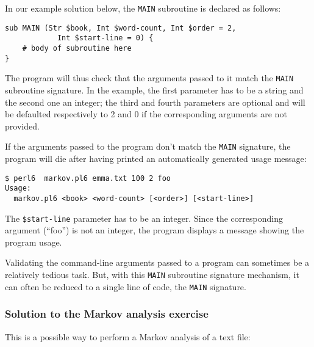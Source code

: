 In our example solution below, the {\tt MAIN} subroutine is declared 
as follows:

\begin{verbatim}
sub MAIN (Str $book, Int $word-count, Int $order = 2, 
            Int $start-line = 0) {
    # body of subroutine here
}
\end{verbatim}

The program will thus check that the arguments passed to it match 
the {\tt MAIN} subroutine signature. In the example, the first 
parameter has to be a string and the second one an integer; the 
third and fourth parameters are optional and will be defaulted 
respectively to 2 and 0 if the corresponding arguments are not 
provided.

If the arguments passed to the program don't match the {\tt MAIN} 
signature, the program will die after having printed an 
automatically generated usage message:

\begin{verbatim}
$ perl6  markov.pl6 emma.txt 100 2 foo
Usage:
  markov.pl6 <book> <word-count> [<order>] [<start-line>]
\end{verbatim}
The \verb'$start-line' parameter has to be an integer. Since 
the corresponding argument (``foo'') is not an integer, the 
program displays a message showing the program usage.

Validating the command-line arguments passed to a program 
can sometimes be a relatively tedious task. But, with this 
{\tt MAIN} subroutine signature mechanism, it can often be 
reduced to a single line of code, the {\tt MAIN} signature.

\subsubsection{Solution to the Markov analysis exercise}

This is a possible way to perform a Markov analysis of a 
text file:


